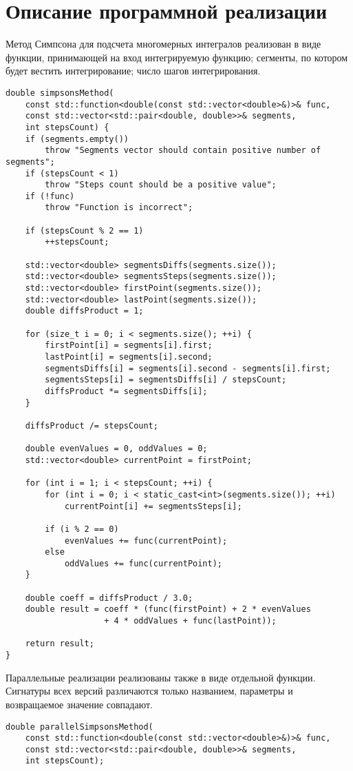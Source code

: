 \documentclass{report}
\begin{document}
\section*{Описание программной реализации}
Метод Симпсона для подсчета многомерных интегралов реализован в виде функции, принимающей на вход интегрируемую функцию; сегменты, по котором будет вестить интегрирование; число шагов интегрирования.
\begin{lstlisting}
double simpsonsMethod(
    const std::function<double(const std::vector<double>&)>& func,
    const std::vector<std::pair<double, double>>& segments,
    int stepsCount) {
    if (segments.empty())
        throw "Segments vector should contain positive number of segments";
    if (stepsCount < 1)
        throw "Steps count should be a positive value";
    if (!func)
        throw "Function is incorrect";

    if (stepsCount % 2 == 1)
        ++stepsCount;

    std::vector<double> segmentsDiffs(segments.size());
    std::vector<double> segmentsSteps(segments.size());
    std::vector<double> firstPoint(segments.size());
    std::vector<double> lastPoint(segments.size());
    double diffsProduct = 1;

    for (size_t i = 0; i < segments.size(); ++i) {
        firstPoint[i] = segments[i].first;
        lastPoint[i] = segments[i].second;
        segmentsDiffs[i] = segments[i].second - segments[i].first;
        segmentsSteps[i] = segmentsDiffs[i] / stepsCount;
        diffsProduct *= segmentsDiffs[i];
    }

    diffsProduct /= stepsCount;

    double evenValues = 0, oddValues = 0;
    std::vector<double> currentPoint = firstPoint;

    for (int i = 1; i < stepsCount; ++i) {
        for (int i = 0; i < static_cast<int>(segments.size()); ++i)
            currentPoint[i] += segmentsSteps[i];

        if (i % 2 == 0)
            evenValues += func(currentPoint);
        else
            oddValues += func(currentPoint);
    }

    double coeff = diffsProduct / 3.0;
    double result = coeff * (func(firstPoint) + 2 * evenValues
                    + 4 * oddValues + func(lastPoint));

    return result;
}
\end{lstlisting}
\par Параллельные реализации реализованы также в виде отдельной функции. Сигнатуры всех версий различаются только названием, параметры и возвращаемое значение совпадают.
\begin{lstlisting}
double parallelSimpsonsMethod(
    const std::function<double(const std::vector<double>&)>& func,
    const std::vector<std::pair<double, double>>& segments,
    int stepsCount);
\end{lstlisting}
\end{document}
